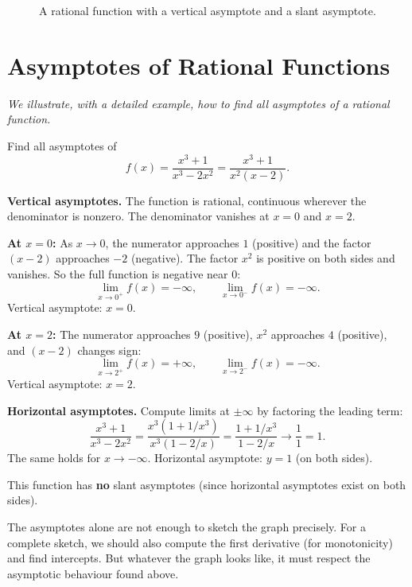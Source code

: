 \begin{figure}[ht]
  \centering
  
  \caption{A rational function with a vertical asymptote and a slant asymptote.}
  \label{fig:vertical-and-slant-asymptotes}
\end{figure}

\section{Asymptotes of Rational Functions}
\label{sec:6.16}

\textit{We illustrate, with a detailed example, how to find all asymptotes of a rational function.}

\begin{example}
\label{ex:6-14}
Find all asymptotes of
\[
  f(x) = \frac{x^{3} + 1}{x^{3} - 2x^{2}} = \frac{x^{3}+1}{x^{2}(x-2)}.
\]

\textbf{Vertical asymptotes.}  The function is rational, continuous wherever the denominator is nonzero.  The denominator vanishes at $x = 0$ and $x = 2$.

\textbf{At $x = 0$:} As $x \to 0$, the numerator approaches $1$ (positive) and the factor $(x-2)$ approaches $-2$ (negative).  The factor $x^{2}$ is positive on both sides and vanishes.  So the full function is negative near $0$:
\[
  \lim_{x \to 0^{+}}f(x) = -\infty, \qquad \lim_{x \to 0^{-}}f(x) = -\infty.
\]
Vertical asymptote: $x = 0$.

\textbf{At $x = 2$:} The numerator approaches $9$ (positive), $x^{2}$ approaches $4$ (positive), and $(x-2)$ changes sign:
\[
  \lim_{x \to 2^{+}}f(x) = +\infty, \qquad \lim_{x \to 2^{-}}f(x) = -\infty.
\]
Vertical asymptote: $x = 2$.

\textbf{Horizontal asymptotes.}  Compute limits at $\pm\infty$ by factoring the leading term:
\[
  \frac{x^{3}+1}{x^{3}-2x^{2}} = \frac{x^{3}(1+1/x^{3})}{x^{3}(1-2/x)} = \frac{1+1/x^{3}}{1-2/x} \to \frac{1}{1} = 1.
\]
The same holds for $x \to -\infty$.  Horizontal asymptote: $y = 1$ (on both sides).

This function has \textbf{no} slant asymptotes (since horizontal asymptotes exist on both sides).
\end{example}

\begin{remark}
The asymptotes alone are not enough to sketch the graph precisely.  For a complete sketch, we should also compute the first derivative (for monotonicity) and find intercepts.  But whatever the graph looks like, it must respect the asymptotic behaviour found above.
\end{remark}

